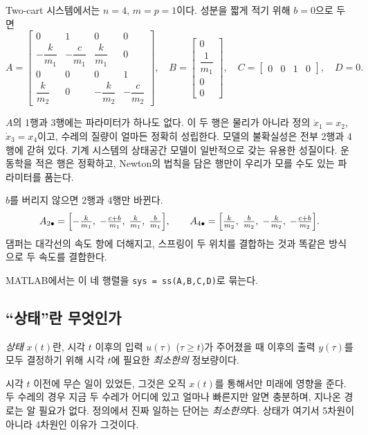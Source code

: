 \documentclass[11pt]{article}
\begin{document}
Two-cart 시스템에서는 $n=4$, $m=p=1$이다. 성분을 짧게 적기 위해 $b=0$으로 두면
\begin{equation}\label{eq:ABCD}
 A=\begin{bmatrix}
     0 & 1 & 0 & 0\\[2pt]
     -\dfrac{k}{m_1} & -\dfrac{c}{m_1} & \dfrac{k}{m_1} & 0\\[6pt]
     0 & 0 & 0 & 1\\[2pt]
     \dfrac{k}{m_2} & 0 & -\dfrac{k}{m_2} & -\dfrac{c}{m_2}
   \end{bmatrix},\quad
 B=\begin{bmatrix}0\\[2pt] \dfrac{1}{m_1}\\[6pt] 0\\[2pt] 0\end{bmatrix},\quad
 C=\begin{bmatrix}0&0&1&0\end{bmatrix},\quad D = 0 .
\end{equation}

\begin{remark}
$A$의 1행과 3행에는 파라미터가 하나도 없다. 이 두 행은 물리가 아니라 정의
$\dot x_1=x_2$, $\dot x_3=x_4$이고, 수레의 질량이 얼마든 정확히 성립한다. 모델의
불확실성은 전부 2행과 4행에 갇혀 있다. 기계 시스템의 상태공간 모델이 일반적으로
갖는 유용한 성질이다. 운동학을 적은 행은 정확하고, Newton의 법칙을 담은 행만이
우리가 모를 수도 있는 파라미터를 품는다.
\end{remark}

\begin{remark}[댐퍼를 남겨 두면]
$b$를 버리지 않으면 2행과 4행만 바뀐다.
\[
   A_{2\bullet}=\Bigl[-\tfrac{k}{m_1},\;-\tfrac{c+b}{m_1},\;\tfrac{k}{m_1},\;\tfrac{b}{m_1}\Bigr],
   \qquad
   A_{4\bullet}=\Bigl[\tfrac{k}{m_2},\;\tfrac{b}{m_2},\;-\tfrac{k}{m_2},\;-\tfrac{c+b}{m_2}\Bigr].
\]
댐퍼는 대각선의 속도 항에 더해지고, 스프링이 두 위치를 결합하는 것과 똑같은
방식으로 두 속도를 결합한다.
\end{remark}

MATLAB에서는 이 네 행렬을 \verb|sys = ss(A,B,C,D)|로 묶는다.

\subsection{``상태''란 무엇인가}
\begin{definition}[상태]\label{def:state}
\emph{상태} $x(t)$란, 시각 $t$ 이후의 입력 $u(\tau)$ ($\tau\ge t$)가 주어졌을 때
이후의 출력 $y(\tau)$를 모두 결정하기 위해 시각 $t$에 필요한 \emph{최소한의}
정보량이다.
\end{definition}
시각 $t$ 이전에 무슨 일이 있었든, 그것은 오직 $x(t)$를 통해서만 미래에 영향을
준다. 두 수레의 경우 지금 두 수레가 어디에 있고 얼마나 빠른지만 알면 충분하며,
지나온 경로는 알 필요가 없다. 정의에서 진짜 일하는 단어는 \emph{최소한의}다.
상태가 여기서 5차원이 아니라 4차원인 이유가 그것이다.
\end{document}
